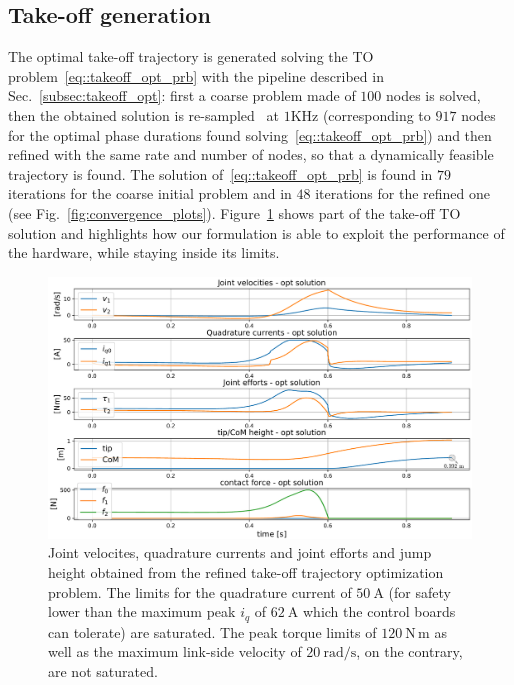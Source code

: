 \subsection{Take-off generation}
The optimal take-off trajectory is generated solving the TO problem~\eqref{eq::takeoff_opt_prb} with the pipeline described in Sec.~\ref{subsec:takeoff_opt}: first a coarse problem made of $100$ nodes is solved, then the obtained solution is re-sampled~\cite{to::horizon_to} at  $1\mathrm{KHz}$ (corresponding to $917$ nodes for the optimal phase durations found solving~\eqref{eq::takeoff_opt_prb}) and then refined with the same rate and number of nodes, so that a dynamically feasible trajectory is found. The solution of~\eqref{eq::takeoff_opt_prb} is found in $79$ iterations for the coarse initial problem and in $48$ iterations for the refined one (see Fig.~\ref{fig:convergence_plots}). 
Figure~\ref{fig:takeoff_opt_data} shows part of the take-off TO solution and highlights how our formulation is able to exploit the performance of the hardware, while staying inside its limits. 
\begin{figure}[h]
	\centering
	\includegraphics[width=1\columnwidth]{images/hardware_saturation_opt.pdf}
	\caption{Joint velocites, quadrature currents and joint efforts and jump height obtained from the refined take-off trajectory optimization problem. The limits for the quadrature current of $50~\mathrm{A}$ (for safety lower than the maximum peak $i_q$ of $62~\mathrm{A}$ which the control boards can tolerate) are saturated. The peak torque limits of $120~\mathrm{N\,m}$ as well as the maximum link-side velocity of $20~\mathrm{rad/s}$, on the contrary, are not saturated.}
	\label{fig:takeoff_opt_data}
\end{figure}
